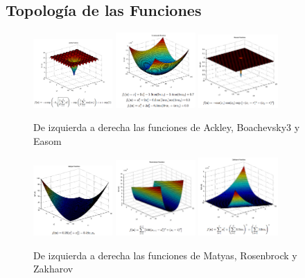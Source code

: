 \documentclass{article}
\begin{document}
\subsection{Topología de las Funciones}
\begin{figure}[h]
\centering
\includegraphics[width=0.27\textwidth]{../imagenes/ackley}
\includegraphics[width=0.27\textwidth]{../imagenes/boachevsky3}
\includegraphics[width=0.27\textwidth]{../imagenes/easom}
\caption{De izquierda a derecha las funciones de Ackley, Boachevsky3 y Easom}
\end{figure}
\begin{figure}[h!]
\centering
\includegraphics[width=0.27\textwidth]{../imagenes/matyas}
\includegraphics[width=0.27\textwidth]{../imagenes/rosenbrock}
\includegraphics[width=0.27\textwidth]{../imagenes/zakharov}
\caption{De izquierda a derecha las funciones de Matyas, Rosenbrock y Zakharov}
\end{figure}
\end{document}
